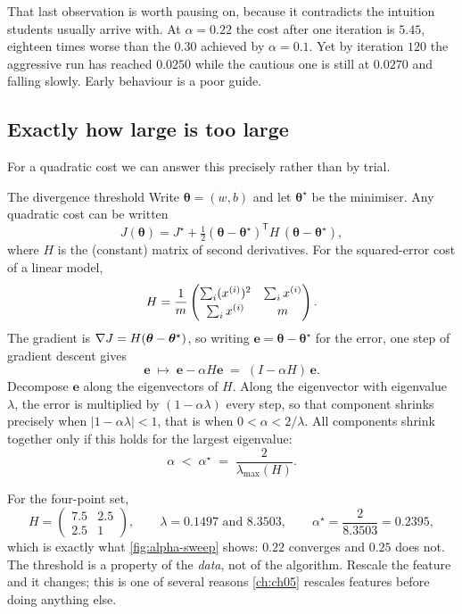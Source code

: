 That last observation is worth pausing on, because it contradicts the intuition
students usually arrive with. At $\alpha = 0.22$ the cost after one iteration is
$5.45$, eighteen times worse than the $0.30$ achieved by $\alpha = 0.1$. Yet by
iteration $120$ the aggressive run has reached $0.0250$ while the cautious one
is still at $0.0270$ and falling slowly. Early behaviour is a poor guide.

\subsection{Exactly how large is too large}

For a quadratic cost we can answer this precisely rather than by trial.

\begin{derivation}{The divergence threshold}
Write $\bm{\theta} = (w,b)$ and let $\bm{\theta}^\star$ be the minimiser. Any
quadratic cost can be written
\[
  J(\bm{\theta}) = J^\star
    + \tfrac12(\bm{\theta}-\bm{\theta}^\star)^{\mathsf{T}}
      H\,(\bm{\theta}-\bm{\theta}^\star),
\]
where $H$ is the (constant) matrix of second derivatives. For the squared-error
cost of a linear model,
\[
  H = \frac1m\begin{pmatrix}\sum_i (x^{(i)})^2 & \sum_i x^{(i)}\\[2pt]
                            \sum_i x^{(i)} & m\end{pmatrix}.
\]
The gradient is $\nabla J = H(\bm{\theta}-\bm{\theta}^\star)$, so writing
$\mathbf{e} = \bm{\theta}-\bm{\theta}^\star$ for the error, one step of gradient
descent gives
\[
  \mathbf{e} \;\mapsto\; \mathbf{e} - \alpha H\mathbf{e}
              \;=\; (I - \alpha H)\,\mathbf{e}.
\]
Decompose $\mathbf{e}$ along the eigenvectors of $H$. Along the eigenvector with
eigenvalue $\lambda$, the error is multiplied by $(1-\alpha\lambda)$ every step,
so that component shrinks precisely when $|1-\alpha\lambda| < 1$, that is when
$0 < \alpha < 2/\lambda$. All components shrink together only if this holds for
the largest eigenvalue:
\begin{equation}
  \alpha \;<\; \alpha^\star \;=\; \frac{2}{\lambda_{\max}(H)} .
  \label{eq:alpha-star}
\end{equation}
\end{derivation}

For the four-point set,
\[
  H = \begin{pmatrix}7.5 & 2.5\\ 2.5 & 1\end{pmatrix},
  \qquad
  \lambda = 0.1497 \text{ and } 8.3503,
  \qquad
  \alpha^\star = \frac{2}{8.3503} = 0.2395,
\]
which is exactly what \cref{fig:alpha-sweep} shows: $0.22$ converges and $0.25$
does not. The threshold is a property of the \emph{data}, not of the algorithm.
Rescale the feature and it changes; this is one of several reasons
\cref{ch:ch05} rescales features before doing anything else.


